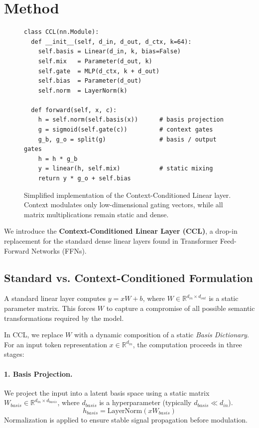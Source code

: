 \documentclass[11pt]{article}
\begin{document}
\section{Method}
\begin{figure}[t]
\begin{minipage}{\columnwidth}
\small
\begin{verbatim}
class CCL(nn.Module):
  def __init__(self, d_in, d_out, d_ctx, k=64):
    self.basis = Linear(d_in, k, bias=False)
    self.mix   = Parameter(d_out, k)
    self.gate  = MLP(d_ctx, k + d_out)
    self.bias  = Parameter(d_out)
    self.norm  = LayerNorm(k)

  def forward(self, x, c):
    h = self.norm(self.basis(x))      # basis projection
    g = sigmoid(self.gate(c))         # context gates
    g_b, g_o = split(g)               # basis / output gates
    h = h * g_b
    y = linear(h, self.mix)           # static mixing
    return y * g_o + self.bias
\end{verbatim}
\end{minipage}
\caption{Simplified implementation of the Context-Conditioned Linear layer.
Context modulates only low-dimensional gating vectors, while all matrix
multiplications remain static and dense.}
\label{fig:remixedlinear}
\end{figure}

We introduce the \textbf{Context-Conditioned Linear Layer (CCL)}, a drop-in replacement for the standard dense linear layers found in Transformer Feed-Forward Networks (FFNs).

\subsection{Standard vs. Context-Conditioned Formulation}
A standard linear layer computes $y = xW + b$, where $W \in \mathbb{R}^{d_{in} \times d_{out}}$ is a static parameter matrix. This forces $W$ to capture a compromise of all possible semantic transformations required by the model.

In CCL, we replace $W$ with a dynamic composition of a static \textit{Basis Dictionary}. For an input token representation $x \in \mathbb{R}^{d_{in}}$, the computation proceeds in three stages:

\paragraph{1. Basis Projection.}
We project the input into a latent basis space using a static matrix $W_{basis} \in \mathbb{R}^{d_{in} \times d_{basis}}$, where $d_{basis}$ is a hyperparameter (typically $d_{basis} \ll d_{in}$).
\begin{equation}
    h_{basis} = \text{LayerNorm}(x W_{basis})
\end{equation}
Normalization is applied to ensure stable signal propagation before modulation.
\end{document}
